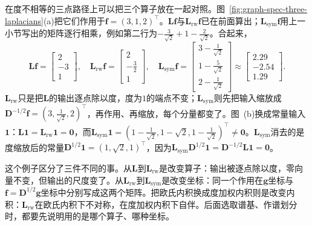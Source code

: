 在度不相等的三点路径上可以把三个算子放在一起对照。图~\ref{fig:graph-spec-three-laplacians}(a)把它们作用于$\bm f=(3,1,2)^{\top}$。$\bm L\bm f$与$\bm L_{\mathrm{rw}}\bm f$已在前面算出；$\bm L_{\mathrm{sym}}\bm f$用上一小节写出的矩阵逐行相乘，例如第二行为$-\tfrac3{\sqrt2}+1-\tfrac2{\sqrt2}$。合起来，
\[
 \bm L\bm f=\begin{bmatrix}2\\-3\\1\end{bmatrix},\quad
 \bm L_{\mathrm{rw}}\bm f=\begin{bmatrix}2\\-\tfrac32\\1\end{bmatrix},\quad
 \bm L_{\mathrm{sym}}\bm f=\begin{bmatrix}3-\tfrac1{\sqrt2}\\1-\tfrac5{\sqrt2}\\2-\tfrac1{\sqrt2}\end{bmatrix}\approx\begin{bmatrix}2.29\\-2.54\\1.29\end{bmatrix}.
\]
$\bm L_{\mathrm{rw}}$只是把$\bm L$的输出逐点除以度，度为$1$的端点不变；$\bm L_{\mathrm{sym}}$则先把输入缩放成$\bm D^{-1/2}\bm f=(3,\tfrac1{\sqrt2},2)^{\top}$，再作用、再缩放，每个分量都变了。图~(b)换成常量输入$\bm1$：$\bm L\bm1=\bm L_{\mathrm{rw}}\bm1=\bm0$，而$\bm L_{\mathrm{sym}}\bm1=(1-\tfrac1{\sqrt2},1-\sqrt2,1-\tfrac1{\sqrt2})^{\top}\neq\bm0$。$\bm L_{\mathrm{sym}}$消去的是度缩放后的常量$\bm D^{1/2}\bm1=(1,\sqrt2,1)^{\top}$，因为$\bm L_{\mathrm{sym}}\bm D^{1/2}\bm1=\bm D^{-1/2}\bm L\bm1=\bm0$。

这个例子区分了三件不同的事。从$\bm L$到$\bm L_{\mathrm{rw}}$是改变算子：输出被逐点除以度，零向量不变，但输出的尺度变了。从$\bm L_{\mathrm{rw}}$到$\bm L_{\mathrm{sym}}$是改变坐标：同一个作用在$\bm g$坐标与$\bm f=\bm D^{1/2}\bm g$坐标中分别写成这两个矩阵。把欧氏内积换成度加权内积则是改变内积：$\bm L_{\mathrm{rw}}$在欧氏内积下不对称，在度加权内积下自伴。后面选取谱基、作谱划分时，都要先说明用的是哪个算子、哪种坐标。
